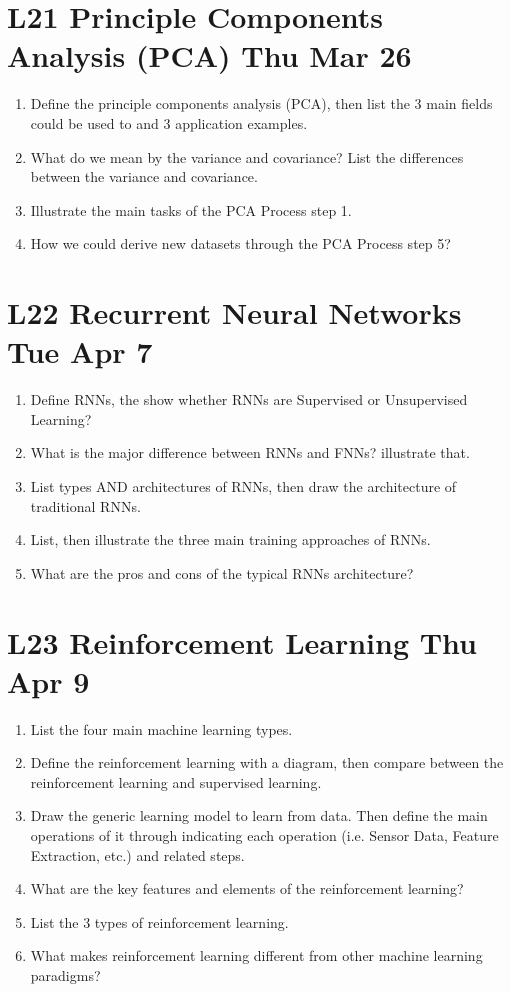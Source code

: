 \documentclass[12pt]{article}
\newenvironment{QandA}{\begin{enumerate}[label=\bfseries\arabic*.]\bfseries}
{\end{enumerate}}
\begin{document}
\section*{L21 Principle Components Analysis (PCA) \textemdash{} Thu Mar 26}
\begin{QandA}
    \item Define the principle components analysis (PCA), then list the 3 main fields could be used to and 3 application examples.
    \item What do we mean by the variance and covariance? List the differences between the variance and covariance.
    \item Illustrate the main tasks of the PCA Process \textemdash{} step 1.
    \item How we could derive new datasets through the PCA Process \textemdash{} step 5?
\end{QandA}

\section*{L22 Recurrent Neural Networks \textemdash{} Tue Apr 7}
\begin{QandA}
    \item Define RNNs, the show whether RNNs are Supervised or Unsupervised Learning? 
    \item What is the major difference between RNNs and FNNs? illustrate that.
    \item List types AND architectures of RNNs, then draw the architecture of traditional RNNs.
    \item List, then illustrate the three main training approaches of RNNs.
    \item What are the pros and cons of the typical RNNs architecture?
\end{QandA}

\section*{L23 Reinforcement Learning \textemdash{} Thu Apr 9}
\begin{QandA}
    \item List the four main machine learning types. 
    \item Define the reinforcement learning with a diagram, then compare between the 
          reinforcement learning and supervised learning.
    \item Draw the generic learning model to learn from data. Then define the main operations of 
          it through indicating each operation (i.e. Sensor Data, Feature Extraction, etc.) and 
          related steps.
    \item What are the key features and elements of the reinforcement learning?
    \item List the 3 types of reinforcement learning.
    \item What makes reinforcement learning different from other machine learning paradigms?
\end{QandA}
\end{document}
